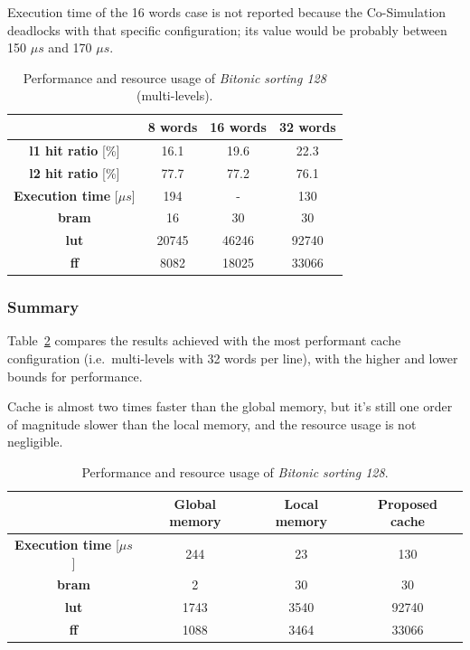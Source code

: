\documentclass[11pt,a4paper,oneside]{memoir}
\begin{document}
Execution time of the 16 words case is not reported because the Co-Simulation
deadlocks with that specific configuration; its value would be probably between
150 $\mu s$ and 170 $\mu s$.

\begin{table}[H]
	\begin{center}
		\begin{tabular}{cccc}
			\hline
			\rowcolor{gray!50}
			& \textbf{8 words} & \textbf{16 words} & \textbf{32 words} \\
			\hline
			\textbf{\ac{l1} hit ratio} [\%] & 16.1 & 19.6 & 22.3 \\
			\rowcolor{gray!25}
			\textbf{\ac{l2} hit ratio} [\%] & 77.7 & 77.2 & 76.1 \\
			\textbf{Execution time} [$\mu s$] & 194 & - & 130 \\
			\rowcolor{gray!25}
			\textbf{\ac{bram}} & 16 & 30 & 30 \\
			\textbf{\acs{lut}} & 20745 & 46246 & 92740 \\
			\rowcolor{gray!25}
			\textbf{\acs{ff}} & 8082 & 18025 & 33066 \\
			\hline
		\end{tabular}
	\end{center}
	\caption{Performance and resource usage of \emph{Bitonic sorting 128} (multi-levels).}
	\label{tab:bitonic_128_l1_report}
\end{table}

\subsubsection{Summary}
Table~\ref{tab:bitonic_128_report} compares the results achieved with the most
performant cache configuration (i.e.\ multi-levels with 32 words per line),
with the higher and lower bounds for performance.

Cache is almost two times faster than the global memory, but it's still one
order of magnitude slower than the local memory, and the resource usage is not
negligible.

\begin{table}[H]
	\begin{center}
		\begin{tabular}{cccc}
			\hline
			\rowcolor{gray!50}
			& \textbf{Global memory} & \textbf{Local memory} &
			\textbf{Proposed cache} \\
			\hline
			\textbf{Execution time} [$\mu s$] & 244 & 23 & 130 \\
			\rowcolor{gray!25}
			\textbf{\ac{bram}} & 2 & 30 & 30 \\
			\textbf{\acs{lut}} & 1743 & 3540 & 92740 \\
			\rowcolor{gray!25}
			\textbf{\acs{ff}} & 1088 & 3464 & 33066 \\
			\hline
		\end{tabular}
	\end{center}
	\caption{Performance and resource usage of \emph{Bitonic sorting 128}.}
	\label{tab:bitonic_128_report}
\end{table}
\end{document}
